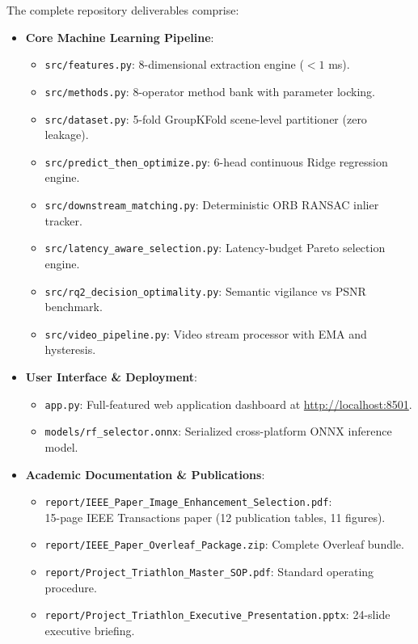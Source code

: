 \documentclass[10pt,a4paper]{article}
\begin{document}
The complete repository deliverables comprise:
\begin{itemize}[leftmargin=*]
    \item \textbf{Core Machine Learning Pipeline}:
    \begin{itemize}
        \item \texttt{src/features.py}: 8-dimensional extraction engine ($<1$ ms).
        \item \texttt{src/methods.py}: 8-operator method bank with parameter locking.
        \item \texttt{src/dataset.py}: 5-fold GroupKFold scene-level partitioner (zero leakage).
        \item \texttt{src/predict\_then\_optimize.py}: 6-head continuous Ridge regression engine.
        \item \texttt{src/downstream\_matching.py}: Deterministic ORB RANSAC inlier tracker.
        \item \texttt{src/latency\_aware\_selection.py}: Latency-budget Pareto selection engine.
        \item \texttt{src/rq2\_decision\_optimality.py}: Semantic vigilance vs PSNR benchmark.
        \item \texttt{src/video\_pipeline.py}: Video stream processor with EMA and hysteresis.
    \end{itemize}
    \item \textbf{User Interface \& Deployment}:
    \begin{itemize}
        \item \texttt{app.py}: Full-featured web application dashboard at \url{http://localhost:8501}.
        \item \texttt{models/rf\_selector.onnx}: Serialized cross-platform ONNX inference model.
    \end{itemize}
    \item \textbf{Academic Documentation \& Publications}:
    \begin{itemize}
        \item \texttt{report/IEEE\_Paper\_Image\_Enhancement\_Selection.pdf}:\\
        15-page IEEE Transactions paper (12 publication tables, 11 figures).
        \item \texttt{report/IEEE\_Paper\_Overleaf\_Package.zip}: Complete Overleaf bundle.
        \item \texttt{report/Project\_Triathlon\_Master\_SOP.pdf}: Standard operating procedure.
        \item \texttt{report/Project\_Triathlon\_Executive\_Presentation.pptx}: 24-slide executive briefing.

\end{itemize}
\end{itemize}
\end{document}
